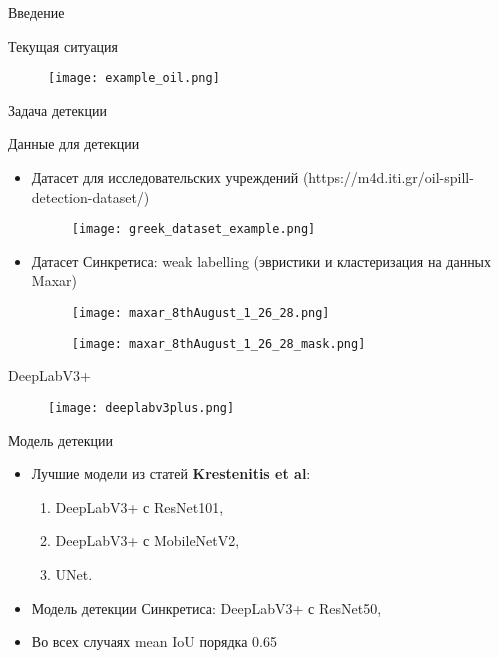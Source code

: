 \documentclass{beamer}
\begin{document}
\begin{section}{Введение}
\begin{frame}{Текущая ситуация}
\begin{figure}[H]
	\centering
	\texttt{[image: example\_oil.png]}
\end{figure}
		
\end{frame}

\end{section}

\begin{section}{Задача детекции}
	\begin{frame}{Данные для детекции}
	\begin{itemize}
		\item Датасет для исследовательских учреждений (https://m4d.iti.gr/oil-spill-detection-dataset/)
		
		\begin{figure}[H]
			\centering
			\texttt{[image: greek\_dataset\_example.png]}
		\end{figure}
		
		\item Датасет Синкретиса: weak labelling (эвристики и кластеризация на данных Maxar)
		
		\begin{figure}
			\centering
			\begin{minipage}{0.5\textwidth}
			\texttt{[image: maxar\_8thAugust\_1\_26\_28.png]}
			\end{minipage}%
		    \begin{minipage}{0.5\textwidth}
		    \texttt{[image: maxar\_8thAugust\_1\_26\_28\_mask.png]}
		    \end{minipage}
	    \end{figure}
	
	\end{itemize}
	\end{frame}

\begin{frame}{DeepLabV3+}
\begin{figure}[H]
\centering
\texttt{[image: deeplabv3plus.png]}
\end{figure}
\end{frame}

\begin{frame}{Модель детекции}
	\begin{itemize}
		\item Лучшие модели из статей \textbf{Krestenitis et al}:
		\begin{enumerate}
			\item DeepLabV3+ с ResNet101,
			\item DeepLabV3+ с MobileNetV2,
			\item UNet.
		\end{enumerate}
	    \item Модель детекции Синкретиса:
	    DeepLabV3+ с ResNet50,
	    \item Во всех случаях mean IoU порядка 0.65
	\end{itemize}


\end{frame}
\end{section}
\end{document}
